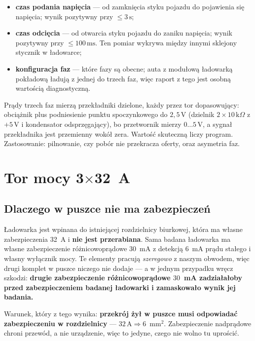 \documentclass[a4paper,11pt]{article}
\newcommand{\kohm}{\,\mathrm{k}\Omega}
\newcommand{\volt}{\,\mathrm{V}}
\newcommand{\amp}{\,\mathrm{A}}
\newcommand{\ms}{\,\mathrm{ms}}
\newcommand{\sek}{\,\mathrm{s}}
\begin{document}
\begin{itemize}
\item \textbf{czas podania napięcia} --- od zamknięcia styku pojazdu do pojawienia
      się napięcia; wynik pozytywny przy $\le3\sek$;
\item \textbf{czas odcięcia} --- od otwarcia styku pojazdu do zaniku napięcia;
      wynik pozytywny przy $\le100\ms$. Ten pomiar wykrywa między innymi sklejony
      stycznik w ładowarce;
\item \textbf{konfiguracja faz} --- które fazy są obecne; auta z modułową ładowarką
      pokładową ładują z jednej do trzech faz, więc raport z tego jest osobną
      wartością diagnostyczną.
\end{itemize}

Prądy trzech faz mierzą przekładniki dzielone, każdy przez tor dopasowujący:
obciążnik plus podniesienie punktu spoczynkowego do $2{,}5\volt$ (dzielnik
$2\times10\kohm$ z $+5\volt$ i kondensator odsprzęgający), bo przetwornik mierzy
$0\ldots5\volt$, a sygnał przekładnika jest przemienny wokół zera. Wartość
skuteczną liczy program. Zastosowanie: pilnowanie, czy pobór nie przekracza oferty,
oraz asymetria faz.

\section{Tor mocy 3\texorpdfstring{$\times$}{x}32~A}

\subsection{Dlaczego w puszce nie ma zabezpieczeń}

Ładowarka jest wpinana do istniejącej rozdzielnicy biurkowej, która ma własne
zabezpieczenia 32~A i \textbf{nie jest przerabiana}. Sama badana ładowarka ma
własne zabezpieczenie różnicowoprądowe $30$~mA z detekcją $6$~mA prądu stałego
i własny wyłącznik mocy. Te elementy pracują \emph{szeregowo} z naszym obwodem,
więc drugi komplet w puszce niczego nie dodaje --- a w jednym przypadku wręcz
szkodzi: \textbf{drugie zabezpieczenie różnicowoprądowe $30$~mA zadziałałoby przed
zabezpieczeniem badanej ładowarki i zamaskowało wynik jej badania.}

Warunek, który z tego wynika: \textbf{przekrój żył w puszce musi odpowiadać
zabezpieczeniu w rozdzielnicy} --- $32\amp \Rightarrow 6$~mm$^2$. Zabezpieczenie
nadprądowe chroni przewód, a nie urządzenie, więc to jedyne, czego nie wolno tu
uprościć.
\end{document}
